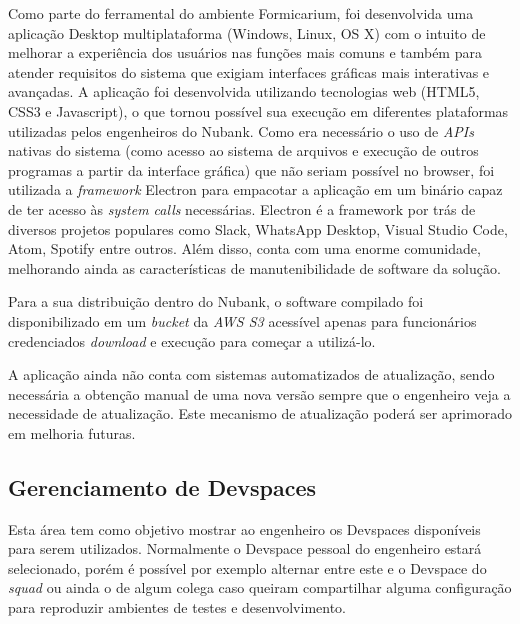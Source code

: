     Como parte do ferramental do ambiente Formicarium, foi desenvolvida uma aplicação Desktop multiplataforma (Windows, Linux, OS X) com o intuito de melhorar a experiência dos usuários nas funções mais comuns e também para atender requisitos do sistema que exigiam interfaces gráficas mais interativas e avançadas. A aplicação foi desenvolvida utilizando tecnologias web (HTML5, CSS3 e Javascript), o que tornou possível sua execução em diferentes plataformas utilizadas pelos engenheiros do Nubank. Como era necessário o uso de \textit{APIs} nativas do sistema (como acesso ao sistema de arquivos e execução de outros programas a partir da interface gráfica) que não seriam possível no browser, foi utilizada a \textit{framework} Electron para empacotar a aplicação em um binário capaz de ter acesso às \textit{system calls} necessárias. Electron é a framework por trás de diversos projetos populares como Slack, WhatsApp Desktop, Visual Studio Code, Atom, Spotify entre outros. Além disso, conta com uma enorme comunidade, melhorando ainda as características de manutenibilidade de software da solução.

    Para a sua distribuição dentro do Nubank, o software compilado foi disponibilizado em um \textit{bucket} da \textit{AWS S3} acessível apenas para funcionários credenciados \textit{download} e execução para começar a utilizá-lo.

    A aplicação ainda não conta com sistemas automatizados de atualização, sendo necessária a obtenção manual de uma nova versão sempre que o engenheiro veja a necessidade de atualização. Este mecanismo de atualização poderá ser aprimorado em melhoria futuras.

    \subsection{Gerenciamento de Devspaces}
    Esta área tem como objetivo mostrar ao engenheiro os Devspaces disponíveis para serem utilizados. Normalmente o Devspace pessoal do engenheiro estará selecionado, porém é possível por exemplo alternar entre este e o Devspace do \textit{squad} ou ainda o de algum colega caso queiram compartilhar alguma configuração para reproduzir ambientes de testes e desenvolvimento.

